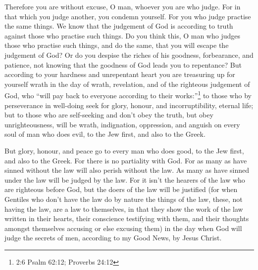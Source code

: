  Therefore you are without excuse, O man, whoever you are
who judge. For in that which you judge another, you condemn yourself.
For you who judge practise the same things.  We know that
the judgement of God is according to truth against those who practise
such things.  Do you think this, O man who judges those who
practise such things, and do the same, that you will escape the
judgement of God?  Or do you despise the riches of his
goodness, forbearance, and patience, not knowing that the goodness of
God leads you to repentance?  But according to your hardness
and unrepentant heart you are treasuring up for yourself wrath in the
day of wrath, revelation, and of the righteous judgement of God,
 who ``will pay back to everyone according to their
works:''\footnote{2:6 Psalm 62:12; Proverbs 24:12}  to those
who by perseverance in well-doing seek for glory, honour, and
incorruptibility, eternal life;  but to those who are
self-seeking and don't obey the truth, but obey unrighteousness, will be
wrath, indignation,  oppression, and anguish on every soul
of man who does evil, to the Jew first, and also to the Greek.

 But glory, honour, and peace go to every man who does
good, to the Jew first, and also to the Greek.  For there
is no partiality with God.  For as many as have sinned
without the law will also perish without the law. As many as have sinned
under the law will be judged by the law.  For it isn't the
hearers of the law who are righteous before God, but the doers of the
law will be justified  (for when Gentiles who don't have
the law do by nature the things of the law, these, not having the law,
are a law to themselves,  in that they show the work of the
law written in their hearts, their conscience testifying with them, and
their thoughts amongst themselves accusing or else excusing them)
 in the day when God will judge the secrets of men,
according to my Good News, by Jesus Christ.

